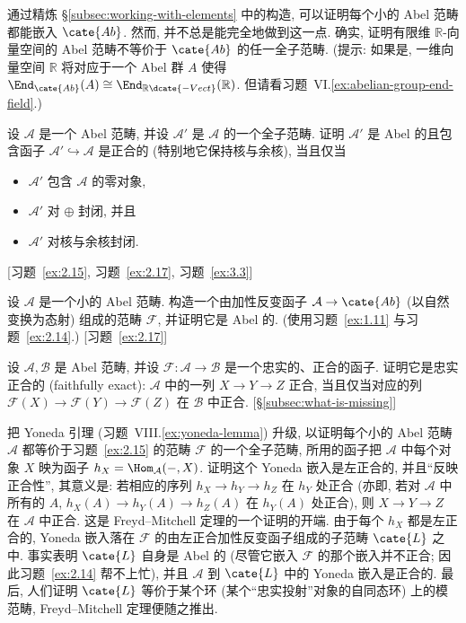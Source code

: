 \begin{prob}\label{ex:2.13}
通过精炼 \S\ref{subsec:working-with-elements} 中的构造, 可以证明每个小的 Abel 范畴都能嵌入 $\cate{Ab}$. 然而, 并不总是能完全地做到这一点.
确实, 证明有限维 $\mathbb{R}$-向量空间的 Abel 范畴不等价于 $\cate{Ab}$ 的任一全子范畴. (提示: 如果是, 一维向量空间 $\mathbb{R}$ 将对应于一个 Abel 群 $A$ 使得 $\End_{\cate{Ab}}(A)\cong\End_{\mathbb{R}\dcate{-Vect}}(\mathbb{R})$. 但请看习题~VI.\ref{ex:abelian-group-end-field}.)
\end{prob}

\begin{prob}\label{ex:2.14}
设 $\mathcal{A}$ 是一个 Abel 范畴, 并设 $\mathcal{A}'$ 是 $\mathcal{A}$ 的一个全子范畴. 证明 $\mathcal{A}'$ 是 Abel 的且包含函子 $\mathcal{A}'\hookrightarrow\mathcal{A}$ 是正合的 (特别地它保持核与余核), 当且仅当
\begin{itemize}
\item $\mathcal{A}'$ 包含 $\mathcal{A}$ 的零对象,
\item $\mathcal{A}'$ 对 $\oplus$ 封闭, 并且
\item $\mathcal{A}'$ 对核与余核封闭.
\end{itemize}
[习题~\ref{ex:2.15}, 习题~\ref{ex:2.17}, 习题~\ref{ex:3.3}]
\end{prob}

\begin{prob}\label{ex:2.15}
设 $\mathcal{A}$ 是一个小的 Abel 范畴. 构造一个由加性反变函子 $\mathcal{A}\to\cate{Ab}$ (以自然变换为态射) 组成的范畴 $\mathcal{F}$, 并证明它是 Abel 的. (使用习题~\ref{ex:1.11} 与习题~\ref{ex:2.14}.) [习题~\ref{ex:2.17}]
\end{prob}

\begin{prob}\label{ex:2.16}
设 $\mathcal{A},\mathcal{B}$ 是 Abel 范畴, 并设 $\mathcal{F}:\mathcal{A}\to\mathcal{B}$ 是一个忠实的、正合的函子. 证明它是忠实正合的 (faithfully exact): $\mathcal{A}$ 中的一列 $X\to Y\to Z$ 正合, 当且仅当对应的列 $\mathcal{F}(X)\to\mathcal{F}(Y)\to\mathcal{F}(Z)$ 在 $\mathcal{B}$ 中正合. [\S\ref{subsec:what-is-missing}]
\end{prob}

\begin{prob}\label{ex:2.17}
把 Yoneda 引理 (习题~VIII.\ref{ex:yoneda-lemma}) 升级, 以证明每个小的 Abel 范畴 $\mathcal{A}$ 都等价于习题~\ref{ex:2.15} 的范畴 $\mathcal{F}$ 的一个全子范畴, 所用的函子把 $\mathcal{A}$ 中每个对象 $X$ 映为函子 $h_X=\Hom_{\mathcal{A}}(-,X)$.
证明这个 Yoneda 嵌入是左正合的, 并且``反映正合性'', 其意义是: 若相应的序列 $h_X\to h_Y\to h_Z$ 在 $h_Y$ 处正合 (亦即, 若对 $\mathcal{A}$ 中所有的 $A$, $h_X(A)\to h_Y(A)\to h_Z(A)$ 在 $h_Y(A)$ 处正合), 则 $X\to Y\to Z$ 在 $\mathcal{A}$ 中正合.
这是 Freyd--Mitchell 定理的一个证明的开端. 由于每个 $h_X$ 都是左正合的, Yoneda 嵌入落在 $\mathcal{F}$ 的由左正合加性反变函子组成的子范畴 $\cate{L}$ 之中. 事实表明 $\cate{L}$ 自身是 Abel 的 (尽管它嵌入 $\mathcal{F}$ 的那个嵌入并不正合; 因此习题~\ref{ex:2.14} 帮不上忙), 并且 $\mathcal{A}$ 到 $\cate{L}$ 中的 Yoneda 嵌入是正合的. 最后, 人们证明 $\cate{L}$ 等价于某个环 (某个``忠实投射''对象的自同态环) 上的模范畴, Freyd--Mitchell 定理便随之推出.
\end{prob}

